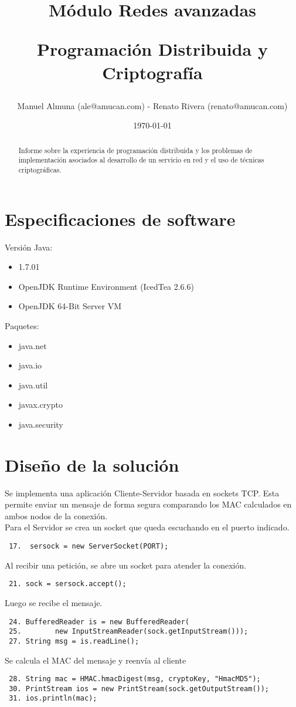 \documentclass[letter, 10pt]{article}
\begin{document}
\title{Módulo Redes avanzadas \\ \begin{Large}Programación Distribuida y Criptografía\end{Large}}
\author{Manuel Almuna (ale@amucan.com) - Renato Rivera (renato@amucan.com)}
\date{\today}
\maketitle

\begin{abstract}
Informe sobre la experiencia de programación distribuida y 	
los problemas de implementación asociados al desarrollo de un servicio en red y	el	
uso de técnicas criptográficas.

\end{abstract}
\section{Especificaciones de software}
Versión Java: 
\begin{itemize}
 \item 1.7.01
 \item OpenJDK Runtime Environment (IcedTea 2.6.6)
 \item OpenJDK 64-Bit Server VM
\end{itemize}
Paquetes:
\begin{itemize}
 \item java.net
 \item java.io
 \item java.util
 \item javax.crypto
 \item java.security
\end{itemize}


\section{Diseño de la solución}
Se implementa una aplicación Cliente-Servidor basada en sockets TCP. Esta permite enviar un mensaje de forma
segura comparando los MAC calculados en ambos nodos de la conexión.
\newline
\\
Para el Servidor se crea un socket que queda escuchando en el puerto indicado.
\begin{verbatim}
 17.  sersock = new ServerSocket(PORT);
\end{verbatim}
Al recibir una petición, se abre un socket para atender la conexión.  
\begin{verbatim}
 21. sock = sersock.accept();
\end{verbatim}
Luego se recibe el mensaje.
\begin{verbatim}
 24. BufferedReader is = new BufferedReader(
 25.        new InputStreamReader(sock.getInputStream()));
 27. String msg = is.readLine();
\end{verbatim}
Se calcula el MAC del mensaje y reenvía al cliente
\begin{verbatim}
 28. String mac = HMAC.hmacDigest(msg, cryptoKey, "HmacMD5"); 
 30. PrintStream ios = new PrintStream(sock.getOutputStream());
 31. ios.println(mac);
\end{verbatim}
\end{document}
